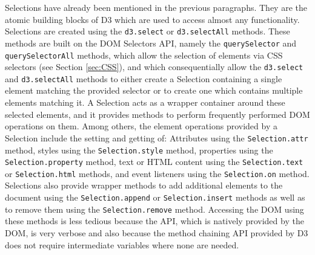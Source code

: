 Selections have already been mentioned in the previous paragraphs. They are the atomic building blocks of D3 which are used to access almost any functionality. Selections are created using the \lstinline{d3.select} or \lstinline{d3.selectAll} methods. These methods are built on the DOM Selectors API, namely the \lstinline{querySelector} and \lstinline{querySelectorAll} methods, which allow the selection of elements via CSS selectors (see Section \ref{sec:CSS}), and which consequentially allow the \lstinline{d3.select} and \lstinline{d3.selectAll} methods to either create a Selection containing a single element matching the provided selector or to create one which contains multiple elements matching it. A Selection acts as a wrapper container around these selected elements, and it provides methods to perform frequently performed DOM operations on them. Among others, the element operations provided by a Selection include the setting and getting of: Attributes using the \lstinline{Selection.attr} method, styles using the \lstinline{Selection.style} method, properties using the \lstinline{Selection.property} method, text or HTML content using the \lstinline{Selection.text} or \lstinline{Selection.html} methods, and event listeners using the \lstinline{Selection.on} method. Selections also provide wrapper methods to add additional elements to the document using the \lstinline{Selection.append} or \lstinline{Selection.insert} methods as well as to remove them using the \lstinline{Selection.remove} method. Accessing the DOM using these methods is less tedious because the API, which is natively provided by the DOM, is very verbose and also because the method chaining API provided by D3 does not require intermediate variables where none are needed.

